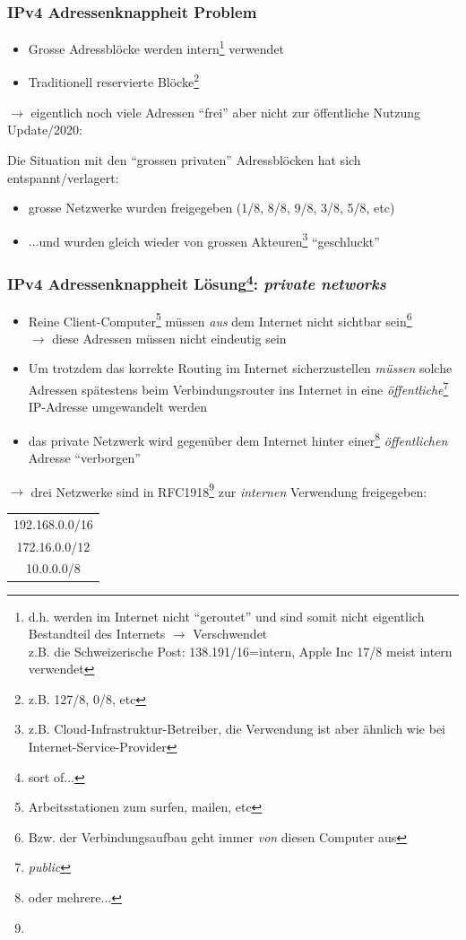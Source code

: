 \documentclass[ignorenonframetext]{beamer}
\begin{document}
\begin{frame}
\frametitle{IPv4 Adressenknappheit Problem}
\begin{itemize}
	\item{Grosse Adressbl\"ocke werden intern\footnote{d.h. werden im Internet nicht ``geroutet'' und sind somit nicht eigentlich Bestandteil des Internets $\rightarrow$ Verschwendet\\z.B. die Schweizerische Post: 138.191/16=intern, Apple Inc 17/8 meist intern verwendet} verwendet}
	\item{Traditionell reservierte Bl\"ocke\footnote{z.B. 127/8, 0/8, etc}}
\end{itemize}
$\rightarrow$ eigentlich noch viele Adressen ``frei'' aber nicht zur \"offentliche Nutzung 
\\
\vspace{1cm}
Update/2020:

Die Situation mit den ``grossen privaten'' Adressbl\"ocken hat sich entspannt/verlagert:
\begin{itemize}
  \item grosse Netzwerke wurden freigegeben (1/8, 8/8, 9/8, 3/8, 5/8, etc)
  \item $\ldots$und wurden gleich wieder von grossen Akteuren\footnote{z.B. Cloud-Infrastruktur-Betreiber, die Verwendung ist aber \"ahnlich wie bei Internet-Service-Provider} ``geschluckt''
\end{itemize}
\end{frame}




\begin{frame}
\frametitle{IPv4 Adressenknappheit L\"osung\footnote{sort of$\ldots$}: {\em private networks}}
\begin{itemize}
	\item{Reine Client-Computer\footnote{Arbeitsstationen zum surfen, mailen, etc} m\"ussen {\em aus} dem Internet nicht sichtbar sein\footnote{Bzw. der Verbindungsaufbau geht immer {\em von} diesen Computer aus}}\\$\rightarrow$ diese Adressen m\"ussen nicht eindeutig sein
	\item{Um trotzdem das korrekte Routing im Internet sicherzustellen {\em m\"ussen} solche Adressen sp\"atestens beim Verbindungsrouter ins Internet in eine {\em \"offentliche}{}\footnote{{\em public}} IP-Adresse umgewandelt werden}
	\item{das private Netzwerk wird gegen\"uber dem Internet hinter einer\footnote{oder mehrere$\ldots$} {\em \"offentlichen} Adresse ``verborgen''}
\end{itemize}
$\rightarrow$ drei Netzwerke sind in RFC1918\footnote{} zur {\em internen} Verwendung freigegeben:
\begin{center}
\begin{tabular}{|c|}
\hline
192.168.0.0/16 \\
172.16.0.0/12 \\
10.0.0.0/8 \\
\hline
\end{tabular}
\end{center}
\end{frame}
\end{document}
